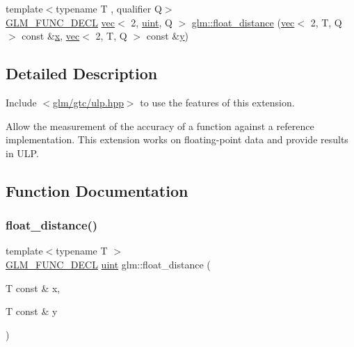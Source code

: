 \begin{DoxyCompactItemize}
\item 
{\footnotesize template$<$typename T , qualifier Q$>$ }\\\hyperlink{setup_8hpp_ab2d052de21a70539923e9bcbf6e83a51}{G\+L\+M\+\_\+\+F\+U\+N\+C\+\_\+\+D\+E\+CL} \hyperlink{structglm_1_1vec}{vec}$<$ 2, \hyperlink{group__core__precision_ga4fd29415871152bfb5abd588334147c8}{uint}, Q $>$ \hyperlink{group__gtc__ulp_ga72b3223069013f336d8c31812b7ada80}{glm\+::float\+\_\+distance} (\hyperlink{structglm_1_1vec}{vec}$<$ 2, T, Q $>$ const \&\hyperlink{_s_d_l__opengl_8h_ad0e63d0edcdbd3d79554076bf309fd47}{x}, \hyperlink{structglm_1_1vec}{vec}$<$ 2, T, Q $>$ const \&\hyperlink{_s_d_l__opengl_8h_a1675d9d7bb68e1657ff028643b4037e3}{y})
\end{DoxyCompactItemize}


\subsection{Detailed Description}
Include $<$\hyperlink{ulp_8hpp}{glm/gtc/ulp.\+hpp}$>$ to use the features of this extension.

Allow the measurement of the accuracy of a function against a reference implementation. This extension works on floating-\/point data and provide results in U\+LP. 

\subsection{Function Documentation}
\mbox{\label{group__gtc__ulp_ga2e09bd6c8b0a9c91f6f5683d68245634}} 
\subsubsection{\texorpdfstring{float\+\_\+distance()}{float\_distance()}\hspace{0.1cm}{\footnotesize\ttfamily [1/2]}}
{\footnotesize\ttfamily template$<$typename T $>$ \\
\hyperlink{setup_8hpp_ab2d052de21a70539923e9bcbf6e83a51}{G\+L\+M\+\_\+\+F\+U\+N\+C\+\_\+\+D\+E\+CL} \hyperlink{group__core__precision_ga4fd29415871152bfb5abd588334147c8}{uint} glm\+::float\+\_\+distance (\begin{DoxyParamCaption}\item[{T const \&}]{x,  }\item[{T const \&}]{y }\end{DoxyParamCaption})}

